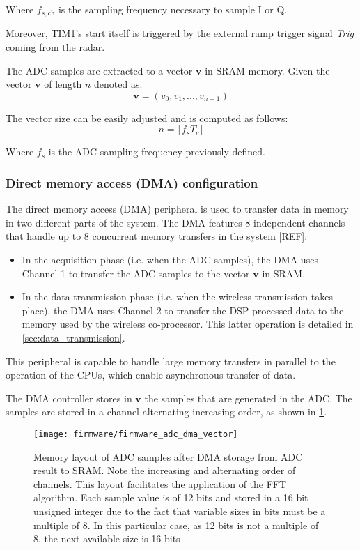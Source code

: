 Where $f_{s,\mathrm{ch}}$ is the sampling frequency necessary to sample I or Q.

Moreover, TIM1's start itself is triggered by the external ramp trigger signal \textit{Trig} coming from the radar.

The ADC samples are extracted to a vector $\mathbf{v}$ in SRAM memory. Given the vector $\mathbf{v}$ of length $n$ denoted as:
\begin{equation}
 \mathbf{v} = (v_0, v_1, ..., v_{n-1})
\end{equation}

The vector size can be easily adjusted and is computed as follows:
\begin{equation}
	n = \lceil f_s T_c \rceil
\end{equation}

Where $f_s$ is the ADC sampling frequency previously defined.

\subsubsection{Direct memory access (DMA) configuration} \label{sec:dma}

The direct memory access (DMA) peripheral is used to transfer data in memory in two different parts of the system. The DMA features 8 independent channels that handle up to 8 concurrent memory transfers in the system [REF]:
\begin{itemize}
	\item In the acquisition phase (i.e. when the ADC samples), the DMA uses Channel 1 to transfer the ADC samples to the vector $\mathbf{v}$ in SRAM.
	\item In the data transmission phase (i.e. when the wireless transmission takes place), the DMA uses Channel 2 to transfer the DSP processed data to the memory used by the wireless co-processor. This latter operation is detailed in \cref{sec:data_transmission}.
\end{itemize}

This peripheral is capable to handle large memory transfers in parallel to the operation of the CPUs, which enable asynchronous transfer of data.

The DMA controller stores in $\mathbf{v}$ the samples that are generated in the ADC. The samples are stored in a channel-alternating increasing order, as shown in \cref{fig:firmware_adc_dma_vector}.

\begin{figure}[ht]
	\centering
	\texttt{[image: firmware/firmware\_adc\_dma\_vector]}
	\caption{Memory layout of ADC samples after DMA storage from ADC result to SRAM. Note the increasing and alternating order of channels. This layout facilitates the application of the FFT algorithm. Each sample value is of 12 bits and stored in a 16 bit unsigned integer due to the fact that variable sizes in bits must be a multiple of 8. In this particular case, as 12 bits is not a multiple of 8, the next available size is 16 bits}
	\label{fig:firmware_adc_dma_vector}
\end{figure}

